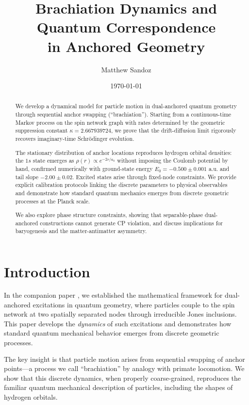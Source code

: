 \documentclass[11pt]{article}
\title{Brachiation Dynamics and Quantum Correspondence \\ in Anchored Geometry}
\author{Matthew Sandoz}
\date{\today}
\theoremstyle{plain}
\theoremstyle{definition}
\begin{document}
\pagestyle{plain}
\maketitle

\begin{abstract}
  We develop a dynamical model for particle motion in dual-anchored quantum geometry through
  sequential anchor swapping (``brachiation''). Starting from a continuous-time Markov
  process on the spin network graph with rates determined by the geometric suppression
  constant $\kappa = 2.667939724$, we prove that the drift-diffusion limit rigorously
  recovers imaginary-time Schrödinger evolution.

  The stationary distribution of anchor locations reproduces hydrogen orbital densities:
  the $1s$ state emerges as $\rho(r) \propto e^{-2r/a_0}$ without imposing the Coulomb
  potential by hand, confirmed numerically with ground-state energy
  $E_0 = -0.500 \pm 0.001$ a.u. and tail slope $-2.00 \pm 0.02$.
  Excited states arise through fixed-node constraints. We provide explicit calibration
  protocols linking the discrete parameters to physical observables and demonstrate how
  standard quantum mechanics emerges from discrete geometric processes at the Planck scale.

  We also explore phase structure constraints, showing that separable-phase dual-anchored
  constructions cannot generate CP violation, and discuss implications for baryogenesis and the
  matter-antimatter asymmetry.
\end{abstract}

\section{Introduction}
\label{sec:intro}

In the companion paper \cite{paper-a1}, we established the mathematical framework for dual-anchored excitations in quantum geometry, where particles couple to the spin network at two spatially separated nodes through irreducible Jones inclusions. This paper develops the \emph{dynamics} of such excitations and demonstrates how standard quantum mechanical behavior emerges from discrete geometric processes.

The key insight is that particle motion arises from sequential swapping of anchor points—a process we call ``brachiation'' by analogy with primate locomotion. We show that this discrete dynamics, when properly coarse-grained, reproduces the familiar quantum mechanical description of particles, including the shapes of hydrogen orbitals.
\end{document}
